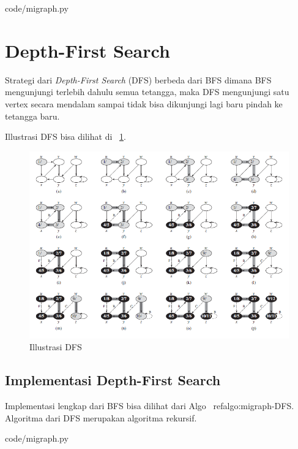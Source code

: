 
                {code/migraph.py}
								
\section{Depth-First Search}

Strategi dari \textit{Depth-First Search} (DFS) berbeda dari BFS dimana BFS mengunjungi terlebih dahulu semua tetangga, maka DFS mengunjungi satu vertex secara mendalam sampai tidak bisa dikunjungi lagi baru pindah ke tetangga baru. 

Illustrasi DFS bisa dilihat di ~\ref{fig:Dfs}.

\begin{figure}
    \includegraphics[width=\textwidth,keepaspectratio]{fig/DFS.png}%
	\caption{Illustrasi DFS}%
	\label{fig:Dfs}%
\end{figure}


\subsection{Implementasi Depth-First Search}

Implementasi lengkap dari BFS bisa dilihat dari Algo ~ref{algo:migraph-DFS}. Algoritma dari DFS merupakan algoritma rekursif.


                {code/migraph.py}

